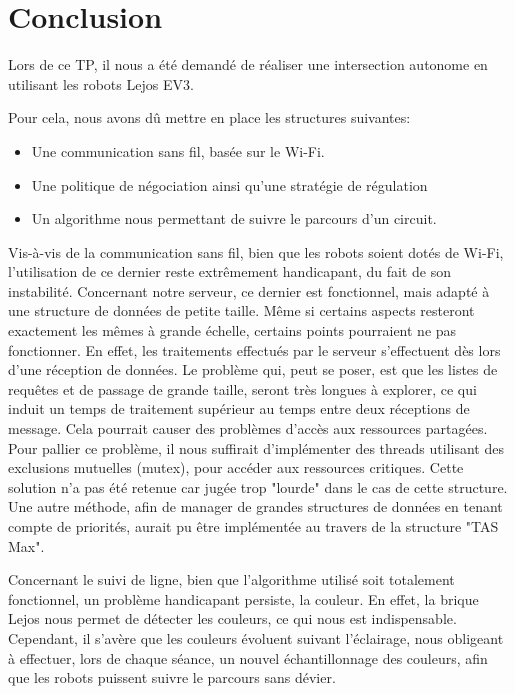 \documentclass[french,a4paper,12pt]{report}
\begin{document}
\chapter{Conclusion}
Lors de ce TP, il nous a été demandé de réaliser une intersection autonome en utilisant les robots Lejos EV3.

Pour cela, nous avons dû mettre en place les structures suivantes:
\begin{itemize}
\item Une communication sans fil, basée sur le Wi-Fi.

\item Une politique de négociation ainsi qu'une stratégie de régulation

\item Un algorithme nous permettant de suivre le parcours d'un circuit.
\end{itemize}

Vis-à-vis de la communication sans fil, bien que les robots soient dotés de Wi-Fi, l'utilisation de ce dernier reste extrêmement handicapant, du fait de son instabilité.
Concernant notre serveur, ce dernier est fonctionnel, mais adapté à une structure de données de petite taille. Même si certains aspects resteront exactement les mêmes à grande échelle, certains points pourraient ne pas fonctionner. 
En effet, les traitements effectués par le serveur s'effectuent dès lors d'une réception de données. Le problème qui, peut se poser, est que les listes de requêtes et de passage de grande taille, seront très longues à explorer, ce qui induit un temps de traitement supérieur au temps entre deux réceptions de message. Cela pourrait causer des problèmes d'accès aux ressources partagées.
Pour pallier ce problème, il nous suffirait d’implémenter des threads utilisant des exclusions mutuelles (mutex), pour accéder aux ressources critiques. Cette solution n’a pas été retenue car jugée trop "lourde" dans le cas de cette structure.
Une autre méthode, afin de manager de grandes structures de données en tenant compte de priorités, aurait pu être implémentée au travers de la structure "TAS Max".

Concernant le suivi de ligne, bien que l'algorithme utilisé soit totalement fonctionnel, un problème handicapant persiste, la couleur. En effet, la brique Lejos nous permet de détecter les couleurs, ce qui nous est indispensable. Cependant, il s'avère que les couleurs évoluent suivant l'éclairage, nous obligeant à effectuer, lors de chaque séance, un nouvel échantillonnage des couleurs, afin que les robots puissent suivre le parcours sans dévier.
\end{document}
